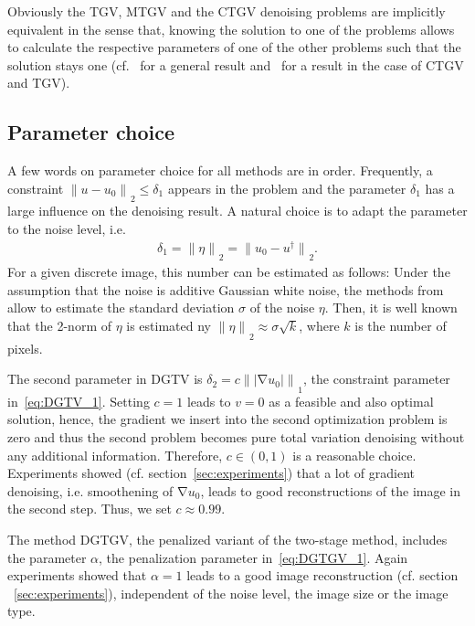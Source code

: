 \documentclass[twocolumn,envcountsame]{svjour3}
\newcommand{\norm}[2][]{{\|{#2}\|_{}}_{#1}}
\newcommand{\abs}[1]{|#1|}
\DeclareMathOperator{\grad}{\nabla}
\begin{document}
Obviously the TGV, MTGV and the CTGV denoising problems are implicitly
equivalent in the sense that, knowing the solution to one of the problems allows to calculate the respective parameters of one of the other problems such that the solution stays one (cf.~\cite[Theorem 2.3]{lorenz2013neccond} for a general result and~\cite[Lemma 1, Lemma 2]{komander2017denoising} for a result in the case of CTGV and TGV).

\subsection{Parameter choice}
\label{subsec:parameter-choice}

A few words on parameter choice for all methods are in order.
Frequently, a constraint
$\norm[2]{u-u_0}\leq \delta_1$ appears in the problem and
the parameter $\delta_{1}$ has a large influence on the denoising result.
A natural choice is to adapt the parameter to the noise level, i.e.
\begin{align*}
	\delta_1 = \norm[2]{\eta} = \norm[2]{u_{0}-u^{\dag}}.
\end{align*}
For a given discrete image, this number can be estimated as follows:
Under the assumption that the noise is additive Gaussian white noise, the methods
from~\cite{liu2012noise,liu2013single} allow to estimate the standard deviation $\sigma$ of the noise $\eta$.
Then, it is well known that the 2-norm of $\eta$ is estimated ny $\norm[2]{\eta} \approx  \sigma\sqrt{k}$, where $k$ is the number of pixels.

The second parameter in DGTV is $\delta_2 = c
\norm[1]{\abs{\grad u_0}}$, the constraint parameter 
in~\eqref{eq:DGTV_1}. 
Setting $c = 1$ leads to $v = 0$ as a feasible and also optimal 
solution, hence, the gradient we insert into the second 
optimization problem is zero and thus the second problem becomes 
pure total variation denoising without any additional 
information. Therefore, $c\in (0,1)$ is a reasonable choice.
Experiments showed (cf. section~\ref{sec:experiments}) that a lot 
of gradient denoising, i.e. smoothening of $\grad u_0$, leads to 
good reconstructions of the image in the second step. Thus, we set 
$c\approx 0.99$. 

The method DGTGV, the penalized variant of the two-stage method, includes the parameter $\alpha$, the penalization parameter 
in~\eqref{eq:DGTGV_1}. Again experiments showed that
$\alpha = 1$ leads to a good image reconstruction (cf. section
~\ref{sec:experiments}), independent of the noise level, the image size or the image type.
\end{document}
